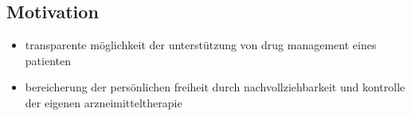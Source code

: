 \subsection{Motivation}
\label{sec-3}

\begin{itemize}
\item transparente möglichkeit der unterstützung von drug management eines patienten
\item bereicherung der persönlichen freiheit durch nachvollziehbarkeit und kontrolle der eigenen arzneimitteltherapie
\end{itemize}

